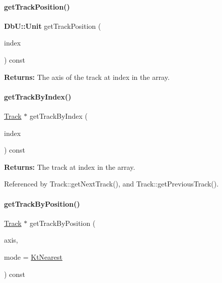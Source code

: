 \paragraph{\texorpdfstring{get\+Track\+Position()}{getTrackPosition()}}
{\footnotesize\ttfamily \textbf{ Db\+U\+::\+Unit} get\+Track\+Position (\begin{DoxyParamCaption}\item[{size\+\_\+t}]{index }\end{DoxyParamCaption}) const\hspace{0.3cm}{\ttfamily [inline]}}

{\bfseries Returns\+:} The axis of the track at {\ttfamily index} in the array. \mbox{\label{classKite_1_1RoutingPlane_a5e9defabb4cb2cb1b0f73b1dc3c677de}} 
\paragraph{\texorpdfstring{get\+Track\+By\+Index()}{getTrackByIndex()}}
{\footnotesize\ttfamily \mbox{\hyperlink{classKite_1_1Track}{Track}} $\ast$ get\+Track\+By\+Index (\begin{DoxyParamCaption}\item[{size\+\_\+t}]{index }\end{DoxyParamCaption}) const}

{\bfseries Returns\+:} The track at {\ttfamily index} in the array. 

Referenced by Track\+::get\+Next\+Track(), and Track\+::get\+Previous\+Track().

\mbox{\label{classKite_1_1RoutingPlane_a8c464eebfa0f85d0b9f4677bb191100c}} 
\paragraph{\texorpdfstring{get\+Track\+By\+Position()}{getTrackByPosition()}}
{\footnotesize\ttfamily \mbox{\hyperlink{classKite_1_1Track}{Track}} $\ast$ get\+Track\+By\+Position (\begin{DoxyParamCaption}\item[{\textbf{ Db\+U\+::\+Unit}}]{axis,  }\item[{unsigned int}]{mode = {\ttfamily \mbox{\hyperlink{namespaceKite_acca8fffa3182dea5f94208f454f14b47afaf04b2ddbae58557683c20373c0bada}{Kt\+Nearest}}} }\end{DoxyParamCaption}) const}

